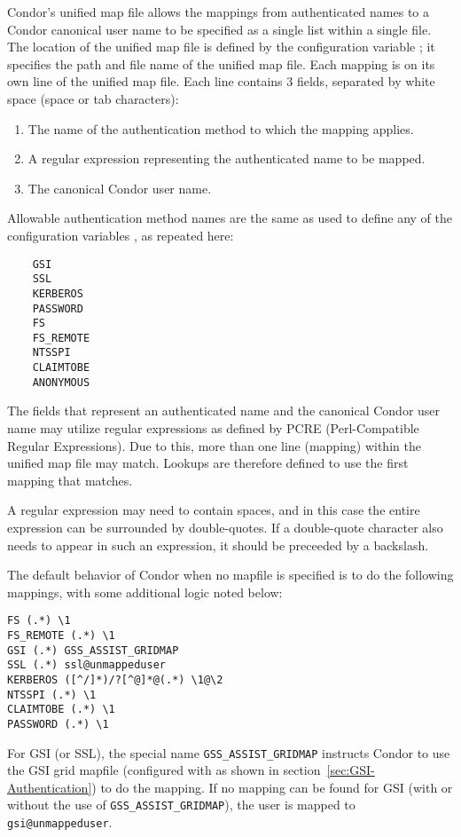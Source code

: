Condor's unified map file allows the mappings
from authenticated names to a Condor canonical user name
to be specified as a single list within a single file. 
The location of the unified map file is defined 
by the configuration variable
; it specifies the
path and file name of the unified map file.
Each mapping is on its own line of the unified map file.
Each line contains 3 fields, separated by white space 
(space or tab characters):
\begin{enumerate}
\item{The name of the authentication method to which the mapping applies.}
\item{A regular expression representing the authenticated name
to be mapped.}
\item{The canonical Condor user name.}
\end{enumerate}

Allowable authentication method names are the same as used to define
any of the configuration variables ,
as repeated here:
\begin{verbatim}
    GSI
    SSL
    KERBEROS
    PASSWORD
    FS
    FS_REMOTE
    NTSSPI
    CLAIMTOBE
    ANONYMOUS
\end{verbatim}

The fields that represent an authenticated name and the canonical
Condor user name may utilize regular expressions as defined 
by PCRE (Perl-Compatible Regular Expressions).
Due to this, more than one line (mapping) within the unified
map file may match.
Lookups are therefore defined to use the first mapping that
matches.

A regular expression may need to contain spaces, and in this case the
entire expression can be surrounded by double-quotes. If a
double-quote character also needs to appear in such an expression, it
should be preceeded by a backslash.

The default behavior of Condor when no mapfile is specified is to
do the following mappings, with some additional logic noted below:
\begin{verbatim}
FS (.*) \1
FS_REMOTE (.*) \1
GSI (.*) GSS_ASSIST_GRIDMAP
SSL (.*) ssl@unmappeduser
KERBEROS ([^/]*)/?[^@]*@(.*) \1@\2
NTSSPI (.*) \1
CLAIMTOBE (.*) \1
PASSWORD (.*) \1
\end{verbatim}

For GSI (or SSL), the special name \verb|GSS_ASSIST_GRIDMAP| instructs Condor
to use the GSI grid mapfile (configured with 
as shown in section~\ref{sec:GSI-Authentication}) to do the mapping.
If no mapping can be found for GSI (with or without the use of
\verb|GSS_ASSIST_GRIDMAP|), the user is mapped to \verb|gsi@unmappeduser|.

